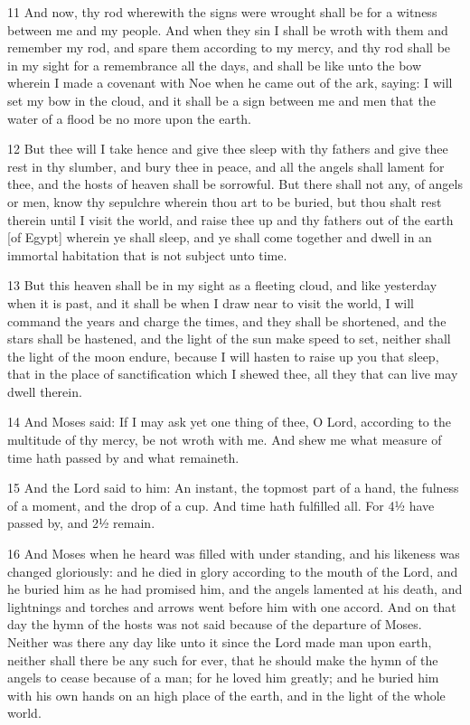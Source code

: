 \par 11 And now, thy rod wherewith the signs were wrought shall be for a witness between me and my people. And when they sin I shall be wroth with them and remember my rod, and spare them according to my mercy, and thy rod shall be in my sight for a remembrance all the days, and shall be like unto the bow wherein I made a covenant with Noe when he came out of the ark, saying: I will set my bow in the cloud, and it shall be a sign between me and men that the water of a flood be no more upon the earth. 

\par 12 But thee will I take hence and give thee sleep with thy fathers and give thee rest in thy slumber, and bury thee in peace, and all the angels shall lament for thee, and the hosts of heaven shall be sorrowful. But there shall not any, of angels or men, know thy sepulchre wherein thou art to be buried, but thou shalt rest therein until I visit the world, and raise thee up and thy fathers out of the earth [of Egypt] wherein ye shall sleep, and ye shall come together and dwell in an immortal habitation that is not subject unto time. 

\par 13 But this heaven shall be in my sight as a fleeting cloud, and like yesterday when it is past, and it shall be when I draw near to visit the world, I will command the years and charge the times, and they shall be shortened, and the stars shall be hastened, and the light of the sun make speed to set, neither shall the light of the moon endure, because I will hasten to raise up you that sleep, that in the place of sanctification which I shewed thee, all they that can live may dwell therein.

\par 14 And Moses said: If I may ask yet one thing of thee, O Lord, according to the multitude of thy mercy, be not wroth with me. And shew me what measure of time hath passed by and what remaineth. 

\par 15 And the Lord said to him: An instant, the topmost part of a hand, the fulness of a moment, and the drop of a cup. And time hath fulfilled all. For 4½ have passed by, and 2½ remain. 

\par 16 And Moses when he heard was filled with under standing, and his likeness was changed gloriously: and he died in glory according to the mouth of the Lord, and he buried him as he had promised him, and the angels lamented at his death, and lightnings and torches and arrows went before him with one accord. And on that day the hymn of the hosts was not said because of the departure of Moses. Neither was there any day like unto it since the Lord made man upon earth, neither shall there be any such for ever, that he should make the hymn of the angels to cease because of a man; for he loved him greatly; and he buried him with his own hands on an high place of the earth, and in the light of the whole world.

